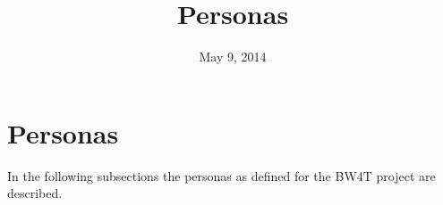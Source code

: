 \documentclass{article}
\begin{document}
\title{Personas}
\date{May 9, 2014}
\maketitle

\section{Personas}
In the following subsections the personas as defined for the BW4T project are described.





\end{document}
